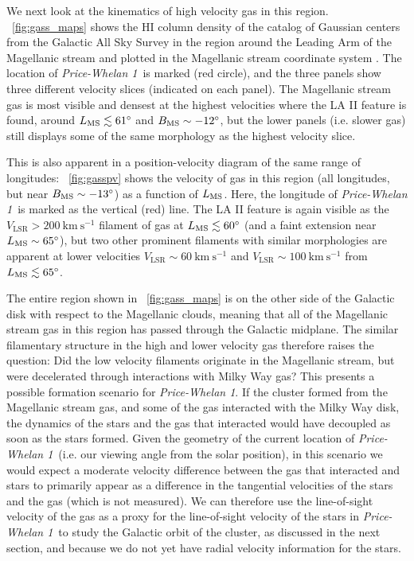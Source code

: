 \documentclass[twocolumn]{aastex62}
\newcommand{\kms}{\ensuremath{\textrm{km}~\textrm{s}^{-1}}}
\newcommand{\hi}{H{\footnotesize I} }
\newcommand{\clustername}{\textsl{Price-Whelan 1}}
\begin{document}
We next look at the kinematics of high velocity gas in this region.
\figurename~\ref{fig:gass_maps} shows the \hi column density of the catalog of Gaussian centers \citep[producted with the techniques and software from][]{Nidever:2008} from the Galactic All Sky Survey \citep[GASS;][]{McClure-Griffiths:2009, Kalberla:2010} in the region around the Leading Arm of the Magellanic stream and plotted in the Magellanic stream coordinate system \citep[$L_{\rm MS}, B_{\rm MS}$;][]{Nidever:2008}.
The location of \clustername\ is marked (red circle), and the three panels show three different velocity slices (indicated on each panel).
The Magellanic stream gas is most visible and densest at the highest velocities where the LA II feature is found, around $L_{\rm MS} \lesssim 61^\circ$ and $B_{\rm MS} \sim -12^\circ$, but the lower panels (i.e. slower gas) still displays some of the same morphology as the highest velocity slice.

This is also apparent in a position-velocity diagram of the same range of longitudes:
\figurename~\ref{fig:gasspv} shows the velocity of gas in this region (all longitudes, but near $B_{\rm MS} \sim -13^\circ$) as a function of $L_{\rm MS}$.
Here, the longitude of \clustername\ is marked as the vertical (red) line.
The LA II feature is again visible as the $V_{\textrm{LSR}} > 200~\kms$ filament of gas at $L_{\rm MS} \lesssim 60^\circ$ (and a faint extension near $L_{\rm MS} \sim 65^\circ$), but two other prominent filaments with similar morphologies are apparent at lower velocities $V_{\textrm{LSR}} \sim 60~\kms$ and $V_{\textrm{LSR}} \sim 100~\kms$ from $L_{\rm MS} \lesssim 65^\circ$.

The entire region shown in \figurename~\ref{fig:gass_maps} is on the other side of the Galactic disk with respect to the Magellanic clouds, meaning that all of the Magellanic stream gas in this region has passed through the Galactic midplane.
The similar filamentary structure in the high and lower velocity gas therefore raises the question: Did the low velocity filaments originate in the Magellanic stream, but were decelerated through interactions with Milky Way gas?
This presents a possible formation scenario for \clustername.
If the cluster formed from the Magellanic stream gas, and some of the gas interacted with the Milky Way disk, the dynamics of the stars and the gas that interacted would have decoupled as soon as the stars formed.
Given the geometry of the current location of \clustername\ (i.e. our viewing angle from the solar position), in this scenario we would expect a moderate velocity difference between the gas that interacted and stars to primarily appear as a difference in the tangential velocities of the stars and the gas (which is not measured).
We can therefore use the line-of-sight velocity of the gas as a proxy for the line-of-sight velocity of the stars in \clustername\ to study the Galactic orbit of the cluster, as discussed in the next section, and because we do not yet have radial velocity information for the stars.
\end{document}
